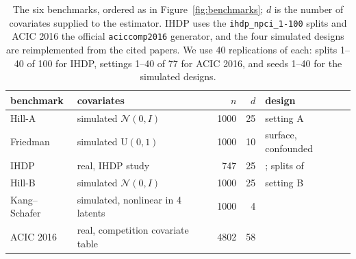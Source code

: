 \begin{table}[H]
\centering
\footnotesize
\setlength{\tabcolsep}{4pt}
\begin{tabular}{llrrl}
\toprule
\textbf{benchmark} & \textbf{covariates} & \textbf{$n$} & \textbf{$d$} & \textbf{design} \\
\midrule
Hill-A & simulated $\mathcal{N}(0, I)$ & 1000 & 25 & \citet{hill2011} setting A \\
Friedman & simulated $\mathrm{U}(0,1)$ & 1000 & 10 & \citet{friedman1991} surface, confounded \\
IHDP & real, IHDP study & 747 & 25 & \citet{hill2011}; splits of \citet{shalit2017} \\
Hill-B & simulated $\mathcal{N}(0, I)$ & 1000 & 25 & \citet{hill2011} setting B \\
Kang--Schafer & simulated, nonlinear in 4 latents & 1000 & 4 & \citet{kang2007} \\
ACIC 2016 & real, competition covariate table & 4802 & 58 & \citet{dorie2019} \\
\bottomrule
\end{tabular}
\caption{The six benchmarks, ordered as in Figure~\ref{fig:benchmarks}; $d$ is the number of covariates supplied to the estimator. IHDP uses the \texttt{ihdp\_npci\_1-100} splits and ACIC 2016 the official \texttt{aciccomp2016} generator, and the four simulated designs are reimplemented from the cited papers. We use 40 replications of each: splits 1--40 of 100 for IHDP, settings 1--40 of 77 for ACIC 2016, and seeds 1--40 for the simulated designs.}
\label{tab:benchmarks}
\end{table}
